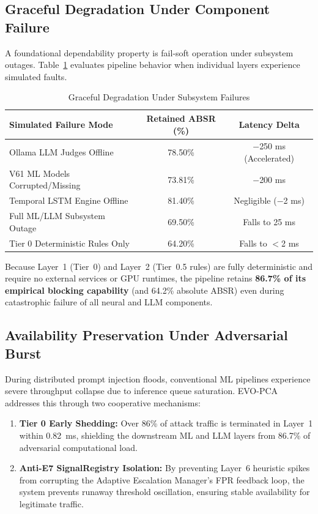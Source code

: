 \documentclass[conference]{IEEEtran}
\begin{document}
\subsection{Graceful Degradation Under Component Failure}
A foundational dependability property is fail-soft operation under subsystem outages. Table~\ref{tab:degradation} evaluates pipeline behavior when individual layers experience simulated faults.

\begin{table}[t]
\caption{Graceful Degradation Under Subsystem Failures}
\label{tab:degradation}
\centering
\begin{tabular}{lcc}
\toprule
\textbf{Simulated Failure Mode} & \textbf{Retained ABSR (\%)} & \textbf{Latency Delta} \\
\midrule
Ollama LLM Judges Offline & 78.50\% & $-$250 ms (Accelerated) \\
V61 ML Models Corrupted/Missing & 73.81\% & $-$200 ms \\
Temporal LSTM Engine Offline & 81.40\% & Negligible ($-$2 ms) \\
Full ML/LLM Subsystem Outage & 69.50\% & Falls to 25 ms \\
Tier 0 Deterministic Rules Only & 64.20\% & Falls to $<$2 ms \\
\bottomrule
\end{tabular}
\end{table}

Because Layer~1 (Tier~0) and Layer~2 (Tier~0.5 rules) are fully deterministic and require no external services or GPU runtimes, the pipeline retains \textbf{86.7\% of its empirical blocking capability} (and 64.2\% absolute ABSR) even during catastrophic failure of all neural and LLM components.

\subsection{Availability Preservation Under Adversarial Burst}
During distributed prompt injection floods, conventional ML pipelines experience severe throughput collapse due to inference queue saturation. EVO-PCA addresses this through two cooperative mechanisms:
\begin{enumerate}[leftmargin=*]
    \item \textbf{Tier 0 Early Shedding:} Over 86\% of attack traffic is terminated in Layer~1 within 0.82~ms, shielding the downstream ML and LLM layers from 86.7\% of adversarial computational load.
    \item \textbf{Anti-E7 SignalRegistry Isolation:} By preventing Layer~6 heuristic spikes from corrupting the Adaptive Escalation Manager's FPR feedback loop, the system prevents runaway threshold oscillation, ensuring stable availability for legitimate traffic.
\end{enumerate}
\end{document}
